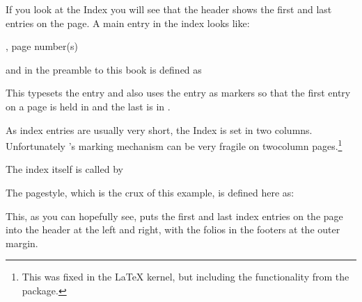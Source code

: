 \begin{plainlist}
    If you look at the Index you will see that the header 
shows the first and last entries on the page.
A main entry in the index looks like:
\begin{lcode}
\item {}, page number(s)
\end{lcode}
and in the preamble to this book \cmd{\idxmark} is defined as
\begin{lcode}
\newcommand{\idxmark}[1]{#1\markboth{#1}{#1}}
\end{lcode}
This typesets the entry and also uses the entry as markers so that
the first entry on a page is held in \cmd{\rightmark} and the last
is in \cmd{\leftmark}.

    As index entries are usually very short, the 
Index is set in two columns. 
Unfortunately \ltx's marking mechanism can be very
fragile on twocolumn pages.\footnote{This was
  fixed in the \LaTeX{} kernel, but including the functionality from
  the  package.}

    The index itself is called by
\begin{lcode}
\clearpage
\pagestyle{index}
\renewcommand{\preindexhook}{%
The first page number is usually, but not always, 
the primary reference to
the indexed topic.\vskip\onelineskip}
\printindex
\end{lcode}


    The  pagestyle, which is the crux of
this example, is defined here as:
\begin{lcode}
\end{lcode}
This, as you can hopefully see, puts the first and last index 
entries on the page into the header at the left and right, 
with the folios in the footers at the 
outer margin.


\end{plainlist}

